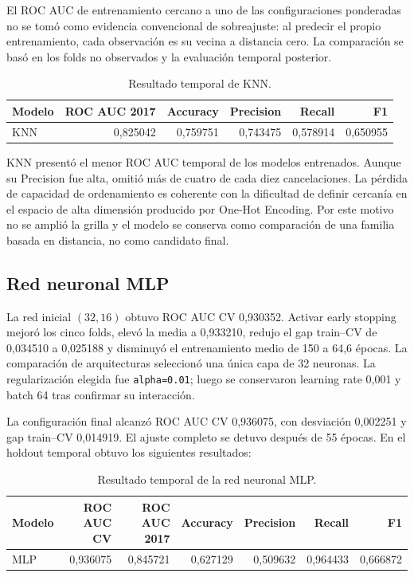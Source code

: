 El ROC AUC de entrenamiento cercano a uno de las configuraciones ponderadas no
se tomó como evidencia convencional de sobreajuste: al predecir el propio
entrenamiento, cada observación es su vecina a distancia cero. La comparación
se basó en los folds no observados y la evaluación temporal posterior.

\begin{table}[htbp]
    \centering
    \caption{Resultado temporal de KNN.}
    \label{tab:knn-results}
    \begin{tabular}{lrrrrr}
        \toprule
        Modelo & ROC AUC 2017 & Accuracy & Precision & Recall & F1 \\
        \midrule
        KNN & 0,825042 & 0,759751 & 0,743475 & 0,578914 & 0,650955 \\
        \bottomrule
    \end{tabular}
\end{table}

KNN presentó el menor ROC AUC temporal de los modelos entrenados. Aunque su
Precision fue alta, omitió más de cuatro de cada diez cancelaciones. La pérdida
de capacidad de ordenamiento es coherente con la dificultad de definir
cercanía en el espacio de alta dimensión producido por One-Hot Encoding. Por
este motivo no se amplió la grilla y el modelo se conserva como comparación de
una familia basada en distancia, no como candidato final.

\subsection{Red neuronal MLP}

La red inicial $(32,16)$ obtuvo ROC AUC CV 0,930352. Activar early stopping
mejoró los cinco folds, elevó la media a 0,933210, redujo el gap train--CV de
0,034510 a 0,025188 y disminuyó el entrenamiento medio de 150 a 64,6 épocas.
La comparación de arquitecturas seleccionó una única capa de 32 neuronas. La
regularización elegida fue \texttt{alpha=0.01}; luego se conservaron learning
rate 0,001 y batch 64 tras confirmar su interacción.

La configuración final alcanzó ROC AUC CV 0,936075, con desviación 0,002251 y
gap train--CV 0,014919. El ajuste completo se detuvo después de 55 épocas. En
el holdout temporal obtuvo los siguientes resultados:

\begin{table}[htbp]
    \centering
    \caption{Resultado temporal de la red neuronal MLP.}
    \label{tab:mlp-results}
    \begin{tabular}{lrrrrrr}
        \toprule
        Modelo & ROC AUC CV & ROC AUC 2017 & Accuracy & Precision & Recall & F1 \\
        \midrule
        MLP & 0,936075 & 0,845721 & 0,627129 & 0,509632 & 0,964433 & 0,666872 \\
        \bottomrule
    \end{tabular}
\end{table}

